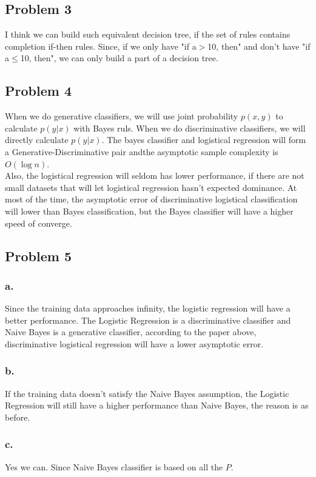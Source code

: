 \documentclass[12pt]{article}
\begin{document}
		\subsection{Problem 3}
			I think we can build such equivalent decision tree, if the set of rules contains completion if-then rules. Since, if we only have "if a$>$10, then" and don't have "if a$\leq$10, then", we can only build a part of a decision tree.
		\subsection{Problem 4}
			When we do generative classifiers, we will use joint probability $p(x,y)$ to calculate $p(y|x)$ with Bayes ruls. When we do discriminative classifiers, we will directly calculate $p(y|x)$. The bayes classifier and logistical regression will form a Generative-Discriminative pair andthe asymptotic sample complexity is $O(\log{n})$. \\
	Also, the logistical regression will seldom has lower performance, if there are not small datasets that will let logistical regression hasn't expected dominance. At most of the time, the asymptotic error of discriminative logistical classification will lower than Bayes classification, but the Bayes classifier will have a higher speed of converge.
		\subsection{Problem 5}
			\subsubsection{a.}
				Since the training data approaches infinity, the logistic regression will have a better performance. The Logistic Regression is a discriminative classifier and Naive Bayes is a generative classifier, according to the paper above, discriminative logistical regression will have a lower asymptotic error.
			\subsubsection{b.}
				If the training data doesn't satisfy the Naive Bayes assumption, the Logistic Regression will still have a higher performance than Naive Bayes, the reason is as before.
			\subsubsection{c.}
				Yes we can. Since Naive Bayes classifier is based on all the $P$.
\end{document}
